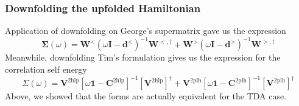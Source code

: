 \subsubsection{Downfolding the upfolded Hamiltonian}
Application of downfolding on George's supermatrix gave us the expression
\begin{equation}
    \mathbf{\Sigma }(\omega )=\mathbf{W}^<(\omega \mathbf{I}-{\mathbf{d}^<})^{-1} {\mathbf{W}}^{<,\dagger} + \mathbf{W}^>(\omega \mathbf{I}-{\mathbf{d}^>})^{-1} {\mathbf{W}}^{>,\dagger}
\label{eq:booth_self_energy}
\end{equation}
Meanwhile, downfolding Tim's formulation gives us the expression for the correlation self energy
\begin{equation}
    \Sigma(\omega)= \mathbf{V}^{2 \mathrm{hlp}}\left[\omega \mathbf{1}-\mathbf{C}^{2 \mathrm{hlp}}\right]^{-1}\left[\mathbf{V}^{2 \mathrm{hlp}}\right]^{\dagger} +\mathbf{V}^{2 \mathrm{plh}}\left[\omega \mathbf{1}-\mathbf{C}^{2 \mathrm{plh}}\right]^{-1}\left[\mathbf{V}^{2 \mathrm{plh}}\right]^{\dagger}
\end{equation}
Above, we showed that the forms are actually equivalent for the TDA case.
